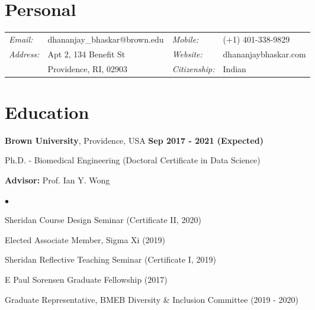 \documentclass[margin,line]{res}
\newenvironment{list1}{
  \begin{list}{\ding{113}}{
      \setlength{\itemsep}{0in}
      \setlength{\parsep}{0in} \setlength{\parskip}{0in}
      \setlength{\topsep}{0in} \setlength{\partopsep}{0in}
      \setlength{\leftmargin}{0.17in}}}{\end{list}}
\newenvironment{list2}{
  \begin{list}{$\bullet$}{
      \setlength{\itemsep}{0in}
      \setlength{\parsep}{0in} \setlength{\parskip}{0in}
      \setlength{\topsep}{0in} \setlength{\partopsep}{0in}
      \setlength{\leftmargin}{0.2in}}}{\end{list}}
\newenvironment{list3}{
  \begin{list}{\textopenbullet}{
      \setlength{\itemsep}{0in}
      \setlength{\parsep}{0in} \setlength{\parskip}{0in}
      \setlength{\topsep}{0in} \setlength{\partopsep}{0in}
      \setlength{\leftmargin}{0.1in}}}{\end{list}}
\begin{document}
\pagestyle{plain}


\begin{resume}

\vspace*{.2cm}

\section{\sc Personal}

\renewcommand{\arraystretch}{1.1}
\begin{tabular}{@{}p{1.4cm}p{6.7cm}p{2.1cm}p{4cm}}
{\it Email:}& dhananjay\_bhaskar@brown.edu &  {\it Mobile:}& (+1) 401-338-9829  \\
{\it Address:}& Apt 2, 134 Benefit St & {\it Website:}& dhananjaybhaskar.com \\
& Providence, RI, 02903 & {\it Citizenship:}& Indian\\
\end{tabular}

\vspace*{.2cm}

\section{\sc Education}

{\bf Brown University}, Providence, USA  \hfill {\bf Sep 2017 - 2021 (Expected)}\\
\vspace*{-.2cm}
\begin{list1}
\item[] Ph.D. - Biomedical Engineering (Doctoral Certificate in Data Science)
\vspace*{.1cm}
\item[] {\bf Advisor:} Prof. Ian Y. Wong
\begin{list2}
\vspace*{.1cm}
\setlength\itemsep{0.25em}
\item Sheridan Course Design Seminar (Certificate II, 2020)
\item Elected Associate Member, Sigma Xi (2019) 
\item Sheridan Reflective Teaching Seminar (Certificate I, 2019)
\item E Paul Sorensen Graduate Fellowship (2017)
\begin{list3}
\vspace*{.1cm}
\item Graduate Representative, BMEB Diversity \& Inclusion Committee (2019 - 2020)
\end{list3}
\end{list2}
\end{list1}
\vspace*{.2cm}


\end{resume}
\end{document}
